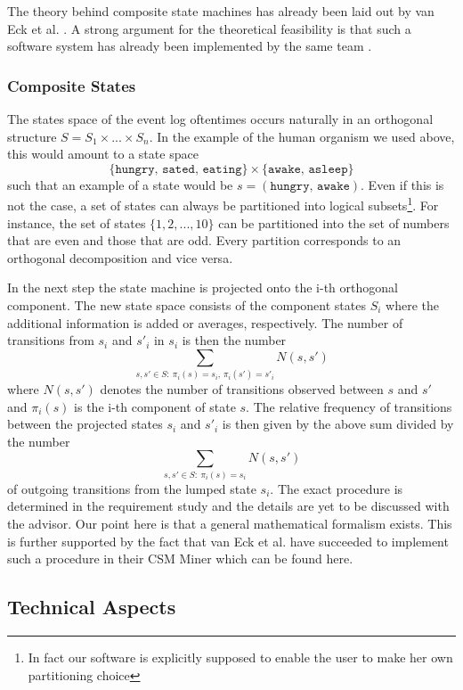 \documentclass[12pt]{extarticle}
\begin{document}
The theory behind composite state machines has already been laid out by van Eck et al. \cite{csm-intro}. A strong argument for the theoretical feasibility is that such a software system has already been implemented by the same team \cite{prom}.

\subsubsection{Composite States}

The states space of the event log oftentimes occurs naturally in an orthogonal structure $S = S_1 \times ... \times S_n$. In the example of the human organism we used above, this would amount to a state space
\[ \{ \texttt{hungry, sated, eating} \} \times \{ \texttt{awake, asleep} \} \]
such that an example of a state would be $s = (\texttt{hungry, awake})$. Even if this is not the case, a set of states can always be partitioned into logical subsets\footnote{In fact our software is explicitly supposed to enable the user to make her own partitioning choice}. For instance, the set of states $\{1, 2, ..., 10\}$ can be partitioned into the set of numbers that are even and those that are odd. Every partition corresponds to an orthogonal decomposition and vice versa.

In the next step the state machine is projected onto the i-th orthogonal component. The new state space consists of the component states $S_i$ where the additional information is added or averages, respectively. The number of transitions from $s_i$ and $s'_i$ in $s_i$ is then the number
\[ 
    \sum_{s,s' \in S:\ \pi_i(s) = s_i,\, \pi_i(s') = s'_i} N(s,s')
\]
where $N(s,s')$ denotes the number of transitions observed between $s$ and $s'$ and $\pi_i(s)$ is the i-th component of state $s$. The relative frequency of transitions between the projected states $s_i$ and $s'_i$ is then given by the above sum divided by the number
\[
    \sum_{s,s' \in S:\ \pi_i(s) = s_i} N(s,s')
\]
of outgoing transitions from the lumped state $s_i$. The exact procedure is determined in the requirement study and the details are yet to be discussed with the advisor. Our point here is that a general mathematical formalism exists. This is further supported by the fact that van Eck et al. have succeeded to implement such a procedure in their CSM Miner which can be found here\cite{prom}.


\subsection{Technical Aspects}
\end{document}
